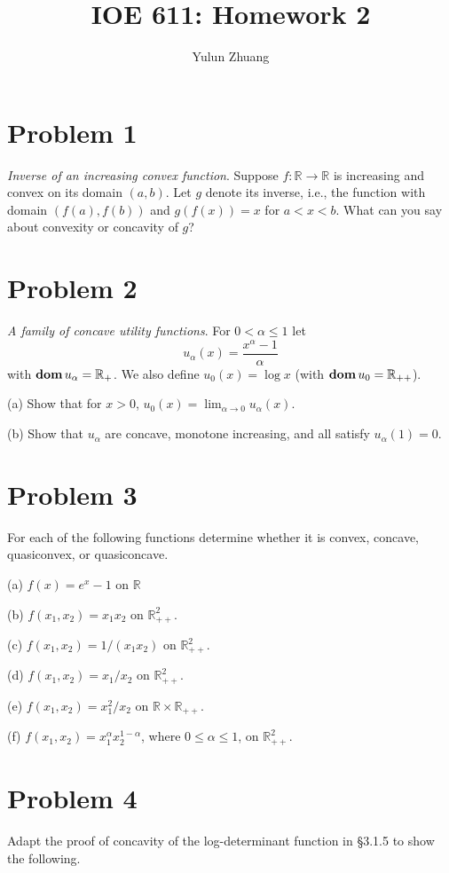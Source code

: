 \documentclass[11pt]{article}
\newcommand{\RR}{\mathbb{R}}
\begin{document}
\title{IOE 611: Homework 2}
\author{Yulun Zhuang}
\maketitle
\section*{Problem 1}
\textit{Inverse of an increasing convex function}. Suppose $f : \RR \rightarrow \RR$ is increasing and convex on its domain $(a, b)$. Let $g$ denote its inverse, i.e., the function with domain $(f(a), f(b))$ and $g(f(x)) = x$ for $a < x < b$. What can you say about convexity or concavity of $g$?




\clearpage
\section*{Problem 2}
\textit{A family of concave utility functions}. For $0 < \alpha \leq 1$ let 
\[
u_\alpha(x) = \frac{x^\alpha - 1}{\alpha}
\]
with $\dom u_\alpha = \RR_+$. We also define $u_0(x) = \log x$ (with $\dom u_0 = \RR_{++}$).

(a) Show that for $x>0$, $u_0(x) = \lim_{\alpha \rightarrow 0} u_\alpha(x)$.


(b) Show that $u_\alpha$ are concave, monotone increasing, and all satisfy $u_\alpha(1) = 0$.

\clearpage
\section*{Problem 3}
For each of the following functions determine whether it is convex, concave, quasiconvex, or quasiconcave.

(a) $f(x)=e^x-1$ on $\RR$

(b) $f\left(x_1, x_2\right)=x_1 x_2$ on $\RR_{++}^2$.

(c) $f\left(x_1, x_2\right)=1 /\left(x_1 x_2\right)$ on $\RR_{++}^2$.

(d) $f\left(x_1, x_2\right)=x_1 / x_2$ on $\RR_{++}^2$.

(e) $f\left(x_1, x_2\right)=x_1^2 / x_2$ on $\RR \times \RR_{++}$.

(f) $f\left(x_1, x_2\right)=x_1^\alpha x_2^{1-\alpha}$, where $0 \leq \alpha \leq 1$, on $\RR_{++}^2$.

\clearpage
\section*{Problem 4}
Adapt the proof of concavity of the log-determinant function in §3.1.5 to show the following.
\end{document}

